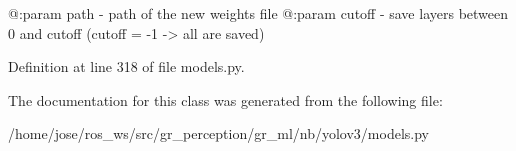 \begin{DoxyVerb}    @:param path    - path of the new weights file
    @:param cutoff  - save layers between 0 and cutoff (cutoff = -1 -> all are saved)
\end{DoxyVerb}
 

Definition at line 318 of file models.\+py.



The documentation for this class was generated from the following file\+:\begin{DoxyCompactItemize}
\item 
/home/jose/ros\+\_\+ws/src/gr\+\_\+perception/gr\+\_\+ml/nb/yolov3/models.\+py\end{DoxyCompactItemize}
